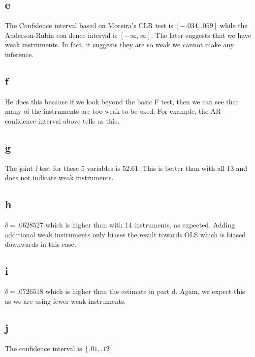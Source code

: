 \documentclass[11pt]{article}
\begin{document}
 \subsection{e}
 The Confidence interval based on Moreira's CLR test is $[ -.034,    .059]$ while the Anderson-Rubin condence interval is $ [-\infty, \infty] $. The later suggests that we have weak instruments. In fact, it suggests they are so weak we cannot make any inference. 
 
  \subsection{f}
  He does this because if we look beyond the basic F test, then we can see that many of the instruments are too weak to be used. For example, the AR confidence interval above tells us this. 
  
  \subsection{g}
  The joint f test for these 5 variables is  52.61. This is better than with all 13 and does not indicate weak instruments.
  
  \subsection{h}
  $\delta = .0628527 $ which is higher than with 14 instruments, as expected. Adding additional weak instruments only biases the result towards OLS which is biased downwards in this case. 
  
  \subsection{i}
  $\delta = .0726518 $ which is higher than the estimate in part d. Again, we expect this as we are using fewer weak instruments. 
  \subsection{j}
  The confidence interval is $ [ .01, .12]$
\end{document}
